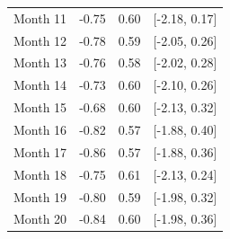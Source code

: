 \begin{tabular}{lrrc}
        Month 11 & -0.75 & 0.60 & [-2.18, 0.17] \\
        Month 12 & -0.78 & 0.59 & [-2.05, 0.26] \\
        Month 13 & -0.76 & 0.58 & [-2.02, 0.28] \\
        Month 14 & -0.73 & 0.60 & [-2.10, 0.26] \\
        Month 15 & -0.68 & 0.60 & [-2.13, 0.32] \\
        Month 16 & -0.82 & 0.57 & [-1.88, 0.40] \\
        Month 17 & -0.86 & 0.57 & [-1.88, 0.36] \\
        Month 18 & -0.75 & 0.61 & [-2.13, 0.24] \\
        Month 19 & -0.80 & 0.59 & [-1.98, 0.32] \\
        Month 20 & -0.84 & 0.60 & [-1.98, 0.36] \\
        \bottomrule
    \end{tabular}